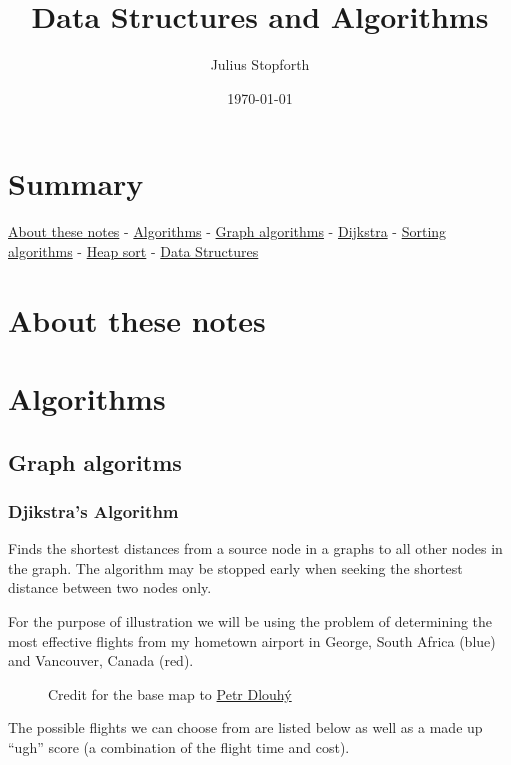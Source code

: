 \documentclass[11pt]{article}
\author{Julius Stopforth}
\date{\today}
\title{Data Structures and Algorithms}
\begin{document}
\maketitle
\tableofcontents

\section{Summary}
\label{summary}
\href{./about.md}{About these notes} -
\href{./ch01-algorithms.md}{Algorithms} - \href{./ch01-01-graph\_algos.md}{Graph
algorithms} - \href{./ch01-01-dijkstra.md}{Dijkstra} -
\href{./ch01-02-sorting\_algos.md}{Sorting algorithms} -
\href{./ch01-02-heapsort.md}{Heap sort} - \href{./ch02-data\_structures.md}{Data
Structures}
\section{About these notes}
\label{sec:org96bf2f2}
\section{Algorithms}
\label{sec:org9c8dc44}
\subsection{Graph algoritms}
\label{sec:org1c1f1a7}
\subsubsection{Djikstra's Algorithm}
\label{sec:org29b3818}

Finds the shortest distances from a source node in a graphs to all other
nodes in the graph. The algorithm may be stopped early when seeking the
shortest distance between two nodes only.

For the purpose of illustration we will be using the problem of
determining the most effective flights from my hometown airport in
George, South Africa (blue) and Vancouver, Canada (red).

\begin{figure}[htbp]
\centering

\caption{Credit for the base map to \href{https://commons.wikimedia.org/wiki/User:Petr\_Dlouh\%C3\%BD}{Petr Dlouhý}}
\end{figure}

The possible flights we can choose from are listed below as well as a
made up ``ugh'' score (a combination of the flight time and cost).
\end{document}

